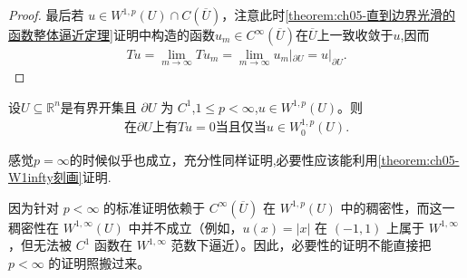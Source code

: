 \documentclass[../../main.tex]{subfiles}
\begin{document}
\begin{proof}
最后若 $u\in W^{1,p}(U)\cap C(\overline{U})$，注意此时\cref{theorem:ch05-直到边界光滑的函数整体逼近定理}证明中构造的函数$u_{m}\in C^{\infty}(\overline{U})$在$\overline{U}$上一致收敛于$u$,因而
\begin{align*}
Tu=\underset{m\rightarrow \infty}{\lim}Tu_m=\underset{m\rightarrow \infty}{\lim}u_m|_{\partial U}=u|_{\partial U}.
\end{align*}
\end{proof}

\begin{theorem}[$W^{1,p}$ 中的零迹函数]\label{theorem:ch05-零迹函数}
设$U\subseteq \mathbb{R}^n$是有界开集且 $\partial U$ 为 $C^{1}$,$1\leqslant p<\infty$,$u\in W^{1,p}(U)$。则
\begin{align*}
\text{在}\partial U\text{上}\text{有}Tu=0\text{当且仅当}u\in W^{1,p}_{0}(U).
\end{align*}
\end{theorem}
\begin{remark}
感觉$p=\infty$的时候似乎也成立，充分性同样证明,必要性应该能利用\cref{theorem:ch05-W1infty刻画}证明.

因为针对 \(p<\infty\) 的标准证明依赖于 \(C^\infty(\overline{U})\) 在 \(W^{1,p}(U)\) 中的稠密性，而这一稠密性在 \(W^{1,\infty}(U)\) 中并不成立（例如，\(u(x)=|x|\) 在 \((-1,1)\) 上属于 \(W^{1,\infty}\)，但无法被 \(C^1\) 函数在 \(W^{1,\infty}\) 范数下逼近）。因此，必要性的证明不能直接把 \(p<\infty\) 的证明照搬过来。
\end{remark}
\end{document}
